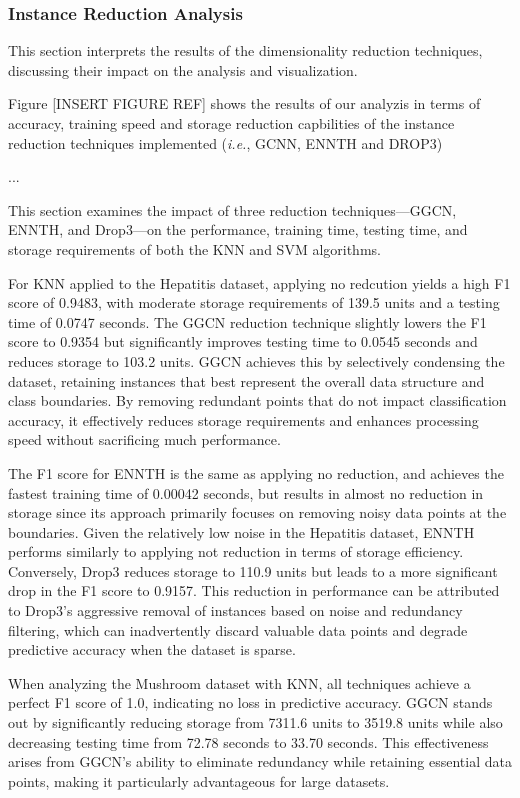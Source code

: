 \subsubsection{Instance Reduction Analysis}
\label{subsubsec:discussion-reduction}

This section interprets the results of the dimensionality reduction techniques, 
discussing their impact on the analysis and visualization.

Figure [INSERT FIGURE REF] shows the results of our analyzis in terms of accuracy, 
training speed and storage reduction capbilities of the instance reduction techniques
 implemented (\textit{i.e.}, GCNN, ENNTH and DROP3)

 ...

This section examines the impact of three reduction techniques—GGCN, ENNTH, and Drop3—on the performance, training time, testing time, and storage requirements of both the KNN and SVM algorithms.

For KNN applied to the Hepatitis dataset, applying no redcution yields a high F1 score of 0.9483, with moderate storage requirements of 139.5 units and a testing time of 0.0747 seconds. 
The GGCN reduction technique slightly lowers the F1 score to 0.9354 but significantly improves testing time to 0.0545 seconds and reduces storage to 103.2 units. 
GGCN achieves this by selectively condensing the dataset, retaining instances that best represent the overall data structure and class boundaries. 
By removing redundant points that do not impact classification accuracy, it effectively reduces storage requirements and enhances processing speed without sacrificing much performance.

The F1 score for ENNTH is the same as applying no reduction, and achieves the fastest training time of 0.00042 seconds, but results in almost no reduction in storage since its approach primarily focuses on removing noisy data points at the boundaries. 
Given the relatively low noise in the Hepatitis dataset, ENNTH performs similarly to applying not reduction in terms of storage efficiency. 
Conversely, Drop3 reduces storage to 110.9 units but leads to a more significant drop in the F1 score to 0.9157. 
This reduction in performance can be attributed to Drop3's aggressive removal of instances based on noise and redundancy filtering, which can inadvertently discard valuable data points and degrade predictive accuracy when the dataset is sparse.

When analyzing the Mushroom dataset with KNN, all techniques achieve a perfect F1 score of 1.0, indicating no loss in predictive accuracy. 
GGCN stands out by significantly reducing storage from 7311.6 units to 3519.8 units while also decreasing testing time from 72.78 seconds to 33.70 seconds. 
This effectiveness arises from GGCN’s ability to eliminate redundancy while retaining essential data points, making it particularly advantageous for large datasets. 

